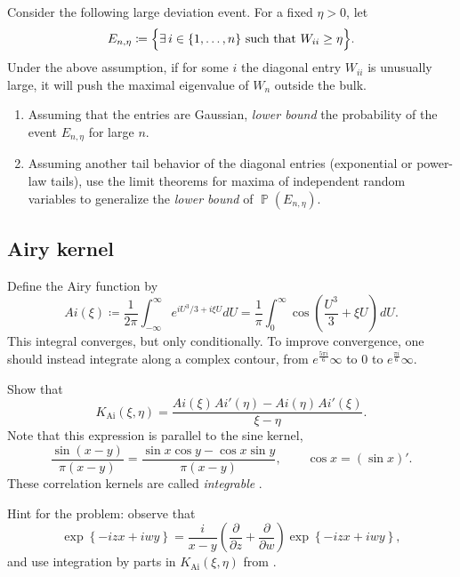 \documentclass[letterpaper,11pt,oneside,reqno]{article}
\numberwithin{equation}{section}
\newcommand{\ssp}{\hspace{1pt}}
\theoremstyle{definition}
\begin{document}
Consider the following large deviation event. For a fixed \(\eta>0\), let
\[
E_{n,\eta}\coloneqq \Bigl\{ \exists\, i\in\{1,\dots,n\} \text{ such that } W_{ii}\ge \eta \Bigr\}.
\]
Under the above assumption, if for some \(i\) the diagonal
entry \(W_{ii}\) is unusually large, it will push the
maximal eigenvalue of \(W_n\) outside the bulk.

\begin{enumerate}
	\item Assuming that the
		entries are Gaussian,
		\emph{lower bound} the probability of the event \(E_{n,\eta}\) for large \(n\).
	\item
		Assuming another tail behavior of the diagonal entries (exponential or
		power-law tails),
		use the limit theorems for maxima of independent random variables to generalize the
		\emph{lower bound} of $\operatorname{\mathbb{P}}(E_{n,\eta})$.
\end{enumerate}



\subsection{Airy kernel}
\label{prob:airy}

Define the Airy function by
\begin{equation*}
	Ai(\xi)\coloneqq
	\frac{1}{2\pi}\int_{-\infty}^\infty
	e^{i U^3/3+i\xi U} dU=
	\frac{1}{\pi}\int_0^\infty
	\cos\left( \frac{U^3}{3}+\xi U \right)\ssp dU.
\end{equation*}
This integral converges, but only conditionally. To improve convergence,
one should instead integrate
along a complex contour,
from $e^{\frac{5 \pi i}{6}}\infty$ to $0$ to
$e^{\frac{\pi i}{6}}\infty$.

Show that
\begin{equation*}
	K_{\mathrm{Ai}}(\xi,\eta)=
	\frac{Ai(\xi)\ssp Ai'(\eta)-Ai(\eta)\ssp Ai'(\xi)}{\xi-\eta}.
\end{equation*}
Note that this expression is parallel to the sine kernel,
\begin{equation*}
	\frac{\sin(x-y)}{\pi(x-y)}=\frac{\sin x\cos y-\cos x\sin y}{\pi(x-y)},\qquad
	\cos x=(\sin x)'.
\end{equation*}
These correlation kernels are called \emph{integrable}
\cite{its1990differential}.

Hint for the problem: observe that
\begin{equation*}
	\exp\left\{ -i z x+iwy \right\}=\frac{i}{x-y}\left( \frac{\partial}{\partial z}+
	\frac{\partial}{\partial w}\right)\exp\left\{ -i z x+iwy \right\},
\end{equation*}
and use integration by parts in $K_{\mathrm{Ai}}(\xi,\eta)$
from .
\end{document}
